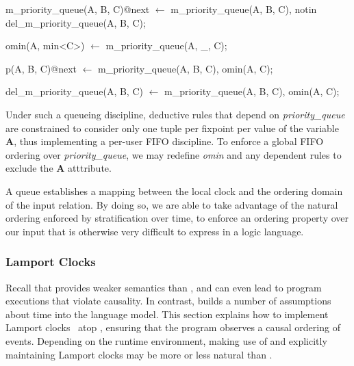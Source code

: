 \begin{Dedalus}

m\_priority\_queue(A, B, C)@next \(\leftarrow\)
  m\_priority\_queue(A, B, C),
  notin del\_m\_priority\_queue(A, B, C);

omin(A, min<C>) \(\leftarrow\)
  m\_priority\_queue(A, _, C);

p(A, B, C)@next \(\leftarrow\)
  m\_priority\_queue(A, B, C),
  omin(A, C);

del\_m\_priority\_queue(A, B, C) \(\leftarrow\)
  m\_priority\_queue(A, B, C),
  omin(A, C);
\end{Dedalus}

Under such a queueing discipline, deductive rules that depend on
\emph{priority\_queue} are constrained to consider only one tuple per fixpoint
per value of the variable \textbf{A}, thus implementing a per-user FIFO
discipline.  To enforce a global FIFO ordering over \emph{priority\_queue}, we
may redefine \emph{omin} and any dependent rules to exclude the \textbf{A}
atttribute.

A queue establishes a mapping between the local clock and the ordering domain of the input relation. By doing so, we are able to take
advantage of the natural ordering enforced by stratification over time, to enforce an ordering property over our input that is otherwise 
very difficult to express in a logic language.

\subsubsection{Lamport Clocks}

Recall that  provides weaker semantics than
, and can even lead to program executions that violate
causality.  In contrast,  builds a number of
assumptions about time into the language model.  This section explains
how to implement Lamport clocks~\cite{timeclocks} atop
, ensuring that the program observes a causal ordering
of events.  Depending on the runtime environment, making use of
 and explicitly maintaining Lamport clocks may be more
or less natural than .

